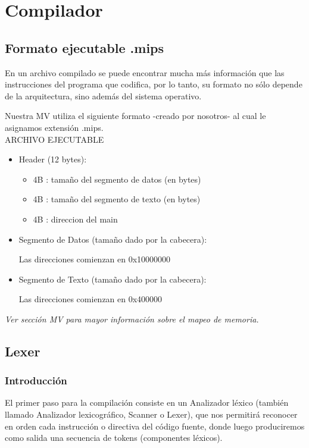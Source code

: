 \documentclass[12pt]{article}
\begin{document}
    
\section{Compilador}
\subsection{Formato ejecutable .mips}

En un archivo compilado se puede encontrar mucha más información que las instrucciones del programa que codifica, por lo tanto, su formato no sólo depende de la arquitectura, sino además del sistema operativo.

Nuestra MV utiliza el siguiente formato -creado por nosotros- al cual le asignamos extensión .mips.
\\

ARCHIVO EJECUTABLE
\begin{itemize}
\item Header (12 bytes):
	\begin{itemize}
    		\item 4B : tamaño del segmento de datos (en bytes)

  		\item 4B : tamaño del segmento de texto (en bytes)

    		\item 4B : direccion del main
	\end{itemize}
\item Segmento de Datos (tamaño dado por la cabecera):

    Las direcciones comienzan en 0x10000000

\item Segmento de Texto (tamaño dado por la cabecera):

    Las direcciones comienzan en 0x400000
\end{itemize}
\textit{Ver sección MV para mayor información sobre el mapeo de memoria.}

\subsection{Lexer}

\subsubsection{Introducción}

El primer paso para la compilación consiste en un Analizador léxico (también llamado Analizador lexicográfico, Scanner o Lexer), que nos permitirá reconocer en orden cada instrucción o directiva del código fuente, donde luego produciremos como salida una secuencia de tokens (componentes léxicos).
\end{document}

